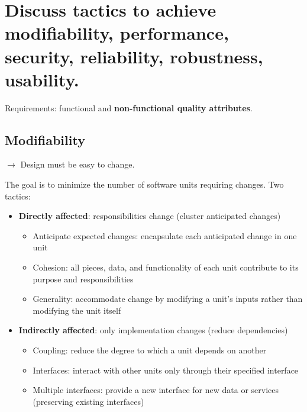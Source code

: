 \clearpage{}
\section{Discuss tactics to achieve modifiability, performance, security,
reliability, robustness, usability.}

Requirements: functional and \textbf{non-functional quality attributes}.

\subsection{Modifiability}

$\rightarrow$ Design must be easy to change.

The goal is to minimize the number of software units requiring changes.
Two tactics:
\begin{itemize}

    \item \textbf{Directly affected}: responsibilities change (cluster
        anticipated changes)

        \begin{itemize}
            \item Anticipate expected changes: encapsulate each anticipated change in one unit
            \item Cohesion: all pieces, data, and functionality of each unit contribute to its purpose
                and responsibilities
            \item Generality: accommodate change by modifying a unit's inputs rather than modifying
                the unit itself
        \end{itemize}

    \item \textbf{Indirectly affected}: only implementation changes
        (reduce dependencies)

        \begin{itemize}
            \item Coupling: reduce the degree to which a unit depends on another
            \item Interfaces: interact with other units only through their specified interface
            \item Multiple interfaces: provide a new interface for new data or services (preserving
                existing interfaces)
        \end{itemize}
\end{itemize}


